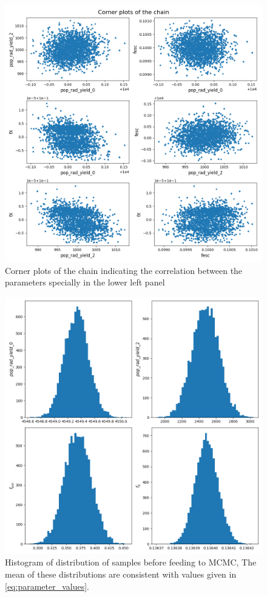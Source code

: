 \documentclass[12pt, TexShade, letterpaper]{report}
\begin{document}
\begin{figure}[h!]
\centering
\includegraphics[scale =0.6]{corner_plots_known_curve.png}
\caption[Corner plots of the chain]{Corner plots of the chain indicating the correlation between the parameters specially in the lower left panel}
\label{fig:corner_plots_known_curve}
\end{figure}
\begin{figure}[h!]
\centering
\includegraphics[scale =0.5]{histograms_edges.png}
\caption[Histogram of distribution of samples]{Histogram of distribution of samples before feeding to MCMC, The mean of these distributions are consistent with values given in \ref{eq:parameter_values}.}
\label{fig:histogram_samples_known_curve}
\end{figure}
\end{document}
